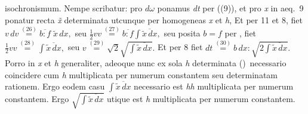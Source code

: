 %
isochronismum.%
\protect{}
Nempe scribatur:
pro $d\omega$ ponamus \textit{dt}
per ((9)),
et pro \textit{x} in aeq.~9%
\protect{}
ponatur recta \textit{\~x}
determinata utcunque per homogeneas \textit{x} et \textit{h},%
\protect{}
%
%
Et per 11 et 8,
fiet $v\,dv \stackrel{(26)}{=} \overline{b:f}\;\tilde{x}\,dx,$
seu
$\displaystyle \frac{1}{2}vv \stackrel{(27)}{=} \overline{b:f}\!\!\int\!\overline{\tilde{x}\,dx},$
seu posita  $b=f$ per
\pend
\newpage
\pstart
{},
fiet
$\displaystyle \frac{1}{2}vv \stackrel{(28)}{=} \!\!\int\!\overline{\tilde{x}\,dx},$
seu
$\displaystyle v \stackrel{(29)}{=} \sqrt{2}\sqrt{\!\!\int\!\overline{\tilde{x}\,dx}}.$
Et per 8
%
%
fiet
$\displaystyle dt \stackrel{(30)}{=} b\,dx : \sqrt{2\!\!\int\!\overline{\tilde{x}\,dx}}.$
Porro in
%
%
\textit{x} et \textit{h} generaliter,
adeoque nunc ex sola \textit{h} determinata%
\lbrack\protect\vphantom()\rbrack\
necessario coincidere cum \textit{h}
multiplicata per numerum constantem%
\protect{}
seu determinatam rationem.%
\protect{}
Ergo eodem casu
$\displaystyle \!\!\int\!\overline{\tilde{x}\,dx}$
necessario est \textit{hh}
multiplicata per numerum constantem.
%
Ergo
$\displaystyle\sqrt{\!\!\int\!\overline{\tilde{x}\,dx}}$
utique
%
est \textit{h} multiplicata per numerum constantem.%
\protect{}
